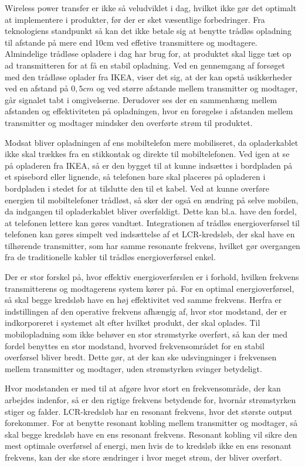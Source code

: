 Wireless power transfer er ikke så veludviklet i dag, hvilket ikke gør det optimalt at implementere i produkter, før der er sket væsentlige forbedringer. Fra teknologiens standpunkt så kan det ikke betale sig at benytte trådløs opladning til afstande på mere end 10cm ved effetive transmittere og modtagere. Almindelige trådløse opladere i dag har brug for, at produktet skal ligge tæt op ad transmitteren for at få en stabil opladning. Ved en gennemgang af forsøget med den trådløse oplader fra IKEA, viser det sig, at der kan opstå usikkerheder ved en afstand på $0,5 cm$ og ved større afstande mellem transmitter og modtager, går signalet tabt i omgivelserne. Derudover ses der en sammenhæng mellem afstanden og effektiviteten på opladningen, hvor en forøgelse i afstanden mellem transmitter og modtager mindsker den overførte strøm til produktet.

Modsat bliver opladningen af ens mobiltelefon mere mobiliseret, da opladerkablet ikke skal trækkes fra en stikkontak og direkte til mobiltelefonen. Ved igen at se på opladeren fra IKEA, så er den bygget til at kunne indsættes i bordpladen på et spisebord eller lignende, så telefonen bare skal placeres på opladeren i bordpladen i stedet for at tilslutte den til et kabel. Ved at kunne overføre energien til mobiltelefoner trådløst, så sker der også en ændring på selve mobilen, da indgangen til opladerkablet bliver overføldigt. Dette kan bl.a. have den fordel, at telefonen lettere kan gøres vandtæt. Integrationen af trådløs energioverførsel til telefonen kan gøres simpelt ved indsættelse af et LCR-kredsløb, der skal have en tilhørende transmitter, som har samme resonante frekvens, hvilket gør overgangen fra de traditionelle kabler til trådløs energioverførsel enkel.

Der er stor forskel på, hvor effektiv energioverførslen er i forhold, hvilken frekvens transmitterens og modtagerens system kører på. For en optimal energioverførsel, så skal begge kredsløb have en høj effektivitet ved samme frekvens. Herfra er indstillingen af den operative frekvens afhængig af, hvor stor modstand, der er indkorporeret i systemet alt efter hvilket produkt, der skal oplades. Til mobilopladning som ikke behøver en stor strømstyrke overført, så kan der med fordel benyttes en stor modstand, hvorved frekvensområdet for en stabil overførsel bliver bredt. Dette gør, at der kan ske udsvingninger i frekvensen mellem transmitter og modtager, uden strømstyrken svinger betydeligt.

Hvor modstanden er med til at afgøre hvor stort en frekvensområde, der kan arbejdes indenfor, så er den rigtige frekvens betydende for, hvornår strømstyrken stiger og falder. LCR-kredsløb har en resonant frekvens, hvor det største output forekommer. For at benytte resonant kobling mellem transmitter og modtager, så skal begge kredsløb have en ens resonant frekvens. Resonant kobling vil sikre den mest optimale overførsel af energi, men hvis de to kredsløb ikke en ens resonant frekvens, kan der ske store ændringer i hvor meget strøm, der bliver overført.
